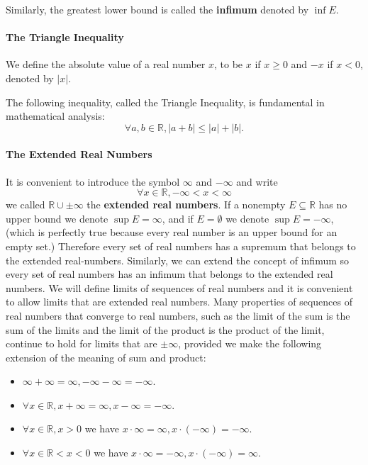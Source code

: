 \documentclass[../main.tex]{subfiles}
\begin{document}
Similarly, the greatest lower bound is called the \textbf{infimum} denoted by $\inf E$.

\paragraph{The Triangle Inequality} We define the absolute value of a real number $x$, to be $x$ if $x \geq 0$ and $-x$ if $x < 0$, denoted by $|x|$.

The following inequality, called the Triangle Inequality, is fundamental in mathematical analysis:
\begin{equation}
	\forall a,b\in \mathbb{R}, |a+b| \leq |a| + |b|.
\end{equation}

\paragraph{The Extended Real Numbers} It is convenient to introduce the symbol $\infty $ and $-\infty $ and write
\begin{equation}
	\forall x\in \mathbb{R}, -\infty <x< \infty
\end{equation}
we called $\mathbb{R} \cup \pm \infty $ the \textbf{extended real numbers}. If a nonempty $E \subseteq \mathbb{R}$ has no upper bound we denote $\sup E = \infty $, and if $E = \emptyset $ we denote $\sup E = -\infty $, (which is perfectly true because every real number is an upper bound for an empty set.) Therefore every set of real numbers has a supremum that belongs to the extended real-numbers. Similarly, we can extend the concept of infimum so every set of real numbers has an infimum that belongs to the extended real numbers. We will define limits of sequences of real numbers and it is convenient to allow limits that are extended real numbers. Many properties of sequences of real numbers that converge to real numbers, such as the limit of the sum is the sum of the limits and the limit of the product is the product of the limit, continue to hold for limits that are $\pm \infty $, provided we make the following extension of the meaning of sum and product:
\begin{itemize}
	\item $\infty +\infty =\infty , -\infty -\infty =-\infty $.
	\item $\forall x\in \mathbb{R}, x+\infty =\infty , x-\infty =-\infty $.
	\item $\forall x\in \mathbb{R},x>0$ we have $x\cdot \infty =\infty , x \cdot (-\infty ) = -\infty $.
	\item $\forall x\in \mathbb{R}< x<0$ we have $x\cdot \infty  = -\infty , x \cdot (-\infty ) = \infty $.
\end{itemize}
\end{document}

